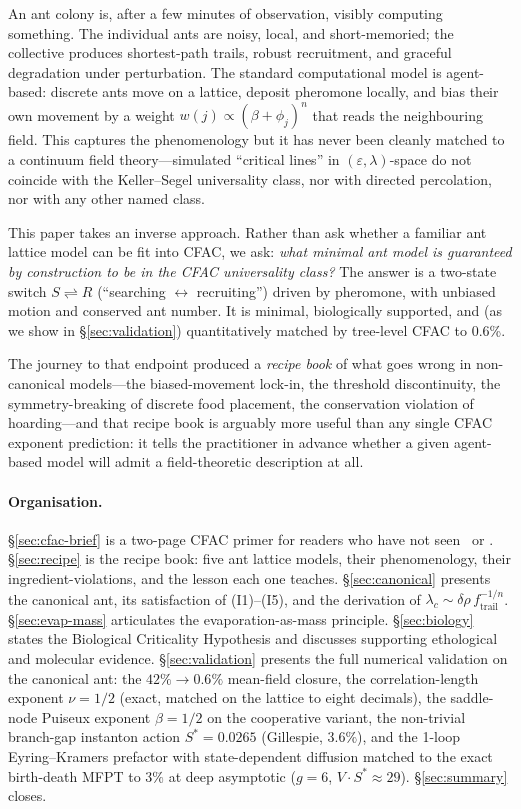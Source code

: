 \documentclass[10pt,a4paper,twocolumn]{article}
\theoremstyle{definition}
\begin{document}
An ant colony is, after a few minutes of observation, visibly
computing something.  The individual ants are noisy, local, and
short-memoried; the collective produces shortest-path trails,
robust recruitment, and graceful degradation under perturbation.
The standard computational model is agent-based: discrete ants
move on a lattice, deposit pheromone locally, and bias their own
movement by a weight $w(j) \propto (\beta + \phi_j)^n$ that
reads the neighbouring field.  This captures the phenomenology
but it has never been cleanly matched to a continuum field
theory---simulated ``critical lines'' in
$(\varepsilon,\lambda)$-space do not coincide with the
Keller--Segel universality class, nor with directed percolation,
nor with any other named class.

This paper takes an inverse approach.  Rather than ask whether
a familiar ant lattice model can be fit into CFAC, we ask:
\emph{what minimal ant model is guaranteed by construction to
be in the CFAC universality class?}  The answer is a
two-state switch $S \rightleftharpoons R$ (``searching $\leftrightarrow$
recruiting'') driven by pheromone, with unbiased motion and
conserved ant number.  It is minimal, biologically supported,
and (as we show in \S\ref{sec:validation}) quantitatively
matched by tree-level CFAC to 0.6\%.

The journey to that endpoint produced a \emph{recipe book} of
what goes wrong in non-canonical models---the biased-movement
lock-in, the threshold discontinuity, the symmetry-breaking of
discrete food placement, the conservation violation of
hoarding---and that recipe book is arguably more useful than
any single CFAC exponent prediction: it tells the practitioner
in advance whether a given agent-based model will admit a
field-theoretic description at all.

\paragraph{Organisation.}
\S\ref{sec:cfac-brief} is a two-page CFAC primer for readers
who have not seen~\citep{Amarteifio2026cfac} or
\citep{Amarteifio2026cfactheorem}.
\S\ref{sec:recipe} is the recipe book: five ant lattice models,
their phenomenology, their ingredient-violations, and the
lesson each one teaches.
\S\ref{sec:canonical} presents the canonical ant, its
satisfaction of (I1)--(I5), and the derivation of
$\lambda_c \sim \delta\rho\,f_{\text{trail}}^{-1/n}$.
\S\ref{sec:evap-mass} articulates the evaporation-as-mass
principle.
\S\ref{sec:biology} states the Biological Criticality
Hypothesis and discusses supporting ethological and molecular
evidence.
\S\ref{sec:validation} presents the full numerical validation on
the canonical ant: the $42\%\!\to\!0.6\%$ mean-field closure, the
correlation-length exponent $\nu = 1/2$ (exact, matched on the
lattice to eight decimals), the saddle-node Puiseux exponent
$\beta = 1/2$ on the cooperative variant, the non-trivial
branch-gap instanton action $S^* = 0.0265$ (Gillespie, $3.6\%$),
and the 1-loop Eyring--Kramers prefactor with state-dependent
diffusion matched to the exact birth-death MFPT to $3\%$ at
deep asymptotic ($g=6$, $V\cdot S^* \approx 29$).
\S\ref{sec:summary} closes.
\end{document}
